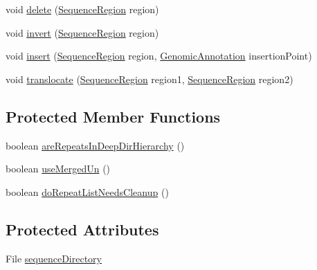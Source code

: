 \begin{DoxyCompactItemize}
void \hyperlink{classbroad_1_1pda_1_1feature_1_1genome_1_1_directory_installed_genome_assembly_a84573a79e07eefb7ea2fe8daf6ec6748}{delete} (\hyperlink{classbroad_1_1core_1_1sequence_1_1_sequence_region}{Sequence\+Region} region)
\item 
void \hyperlink{classbroad_1_1pda_1_1feature_1_1genome_1_1_directory_installed_genome_assembly_a6f2fa0e6a784ea7802e369689f25b332}{invert} (\hyperlink{classbroad_1_1core_1_1sequence_1_1_sequence_region}{Sequence\+Region} region)
\item 
void \hyperlink{classbroad_1_1pda_1_1feature_1_1genome_1_1_directory_installed_genome_assembly_ad320a404ce1ddb695a305d1a495563b8}{insert} (\hyperlink{classbroad_1_1core_1_1sequence_1_1_sequence_region}{Sequence\+Region} region, \hyperlink{interfacebroad_1_1core_1_1annotation_1_1_genomic_annotation}{Genomic\+Annotation} insertion\+Point)
\item 
void \hyperlink{classbroad_1_1pda_1_1feature_1_1genome_1_1_directory_installed_genome_assembly_ac15ba0b30a7ba5d2829da1bd873c7a53}{translocate} (\hyperlink{classbroad_1_1core_1_1sequence_1_1_sequence_region}{Sequence\+Region} region1, \hyperlink{classbroad_1_1core_1_1sequence_1_1_sequence_region}{Sequence\+Region} region2)
\end{DoxyCompactItemize}
\subsection*{Protected Member Functions}
\begin{DoxyCompactItemize}
\item 
boolean \hyperlink{classbroad_1_1pda_1_1feature_1_1genome_1_1_directory_installed_genome_assembly_aad9986b3c509716004fd0517171ce8aa}{are\+Repeats\+In\+Deep\+Dir\+Hierarchy} ()
\item 
boolean \hyperlink{classbroad_1_1pda_1_1feature_1_1genome_1_1_directory_installed_genome_assembly_a46e15462d2fb4e82208976b9bb2003d3}{use\+Merged\+Un} ()
\item 
boolean \hyperlink{classbroad_1_1pda_1_1feature_1_1genome_1_1_directory_installed_genome_assembly_abb1faa50dafc7ad0693a48049d3eab83}{do\+Repeat\+List\+Needs\+Cleanup} ()
\end{DoxyCompactItemize}
\subsection*{Protected Attributes}
\begin{DoxyCompactItemize}
\item 
File \hyperlink{classbroad_1_1pda_1_1feature_1_1genome_1_1_directory_installed_genome_assembly_a529d514f5acc335c587e3a0d86f13762}{sequence\+Directory}
\end{DoxyCompactItemize}



